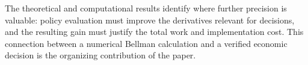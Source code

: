 \documentclass[ecta,nameyear,draft]{econsocart}
\theoremstyle{definition}
\theoremstyle{remark}
\begin{document}
The theoretical and computational results identify where further precision is valuable: policy evaluation must improve the derivatives relevant for decisions, and the resulting gain must justify the total work and implementation cost. This connection between a numerical Bellman calculation and a verified economic decision is the organizing contribution of the paper.


\end{document}
